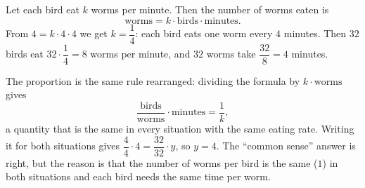 Let each bird eat $k$ worms per minute. Then the number of worms eaten is
\[
\text{worms}=k\cdot\text{birds}\cdot\text{minutes}.
\]
From $4=k\cdot4\cdot4$ we get $k=\dfrac{1}{4}$: each bird eats one worm every $4$ minutes. Then $32$ birds eat $32\cdot\dfrac{1}{4}=8$ worms per minute, and $32$ worms take $\dfrac{32}{8}=\boxed{4}$ minutes.

The proportion is the same rule rearranged: dividing the formula by $k\cdot\text{worms}$ gives
\[
\dfrac{\text{birds}}{\text{worms}}\cdot\text{minutes}=\dfrac{1}{k} ,
\]
a quantity that is the same in every situation with the same eating rate. Writing it for both situations gives $\dfrac{4}{4}\cdot4=\dfrac{32}{32}\cdot y$, so $y=4$. The ``common sense'' answer is right, but the reason is that the number of worms per bird is the same ($1$) in both situations and each bird needs the same time per worm.

